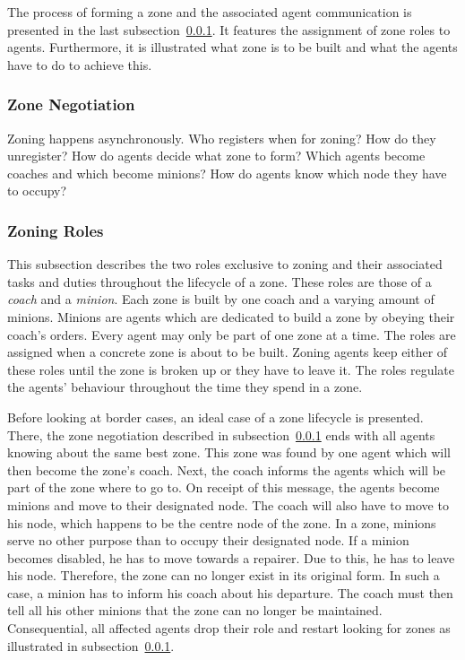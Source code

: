 The process of forming a zone and the associated agent communication is presented in the last subsection~\ref{alg:zon_formation}. It features the assignment of zone roles to agents. Furthermore, it is illustrated what zone is to be built and what the agents have to do to achieve this.



\subsubsection{Zone Negotiation}\label{alg:zon_formation}
Zoning happens asynchronously. Who registers when for zoning? How do they unregister?
How do agents decide what zone to form? Which agents become coaches and which become minions? How do agents know which node they have to occupy?

\subsubsection{Zoning Roles}\label{alg:zon_roles}
This subsection describes the two roles exclusive to zoning and their associated tasks and duties throughout the lifecycle of a zone. These roles are those of a \emph{coach} and a \emph{minion}. Each zone is built by one coach and a varying amount of minions. Minions are agents which are dedicated to build a zone by obeying their coach's orders. Every agent may only be part of one zone at a time. %
The roles are assigned when a concrete zone is about to be built. Zoning agents keep either of these roles until the zone is broken up or they have to leave it. The roles regulate the agents' behaviour throughout the time they spend in a zone.


Before looking at border cases, an ideal case of a zone lifecycle is presented. There, the zone negotiation described in subsection~\ref{alg:zon_formation} ends with all agents knowing about the same best zone. This zone was found by one agent which will then become the zone's coach. Next, the coach informs the agents which will be part of the zone where to go to. On receipt of this message, the agents become minions and move to their designated node. The coach will also have to move to his node, which happens to be the centre node of the zone.
In a zone, minions serve no other purpose than to occupy their designated node. If a minion becomes disabled, he has to move towards a repairer. Due to this, he has to leave his node. Therefore, the zone can no longer exist in its original form. In such a case, a minion has to inform his coach about his departure. The coach must then tell all his other minions that the zone can no longer be maintained. Consequential, all affected agents drop their role and restart looking for zones as illustrated in subsection~\ref{alg:zon_formation}.

